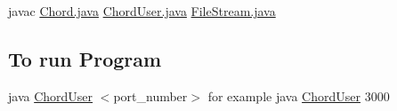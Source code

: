 {\ttfamily javac \hyperlink{_chord_8java}{Chord.\+java} \hyperlink{_chord_user_8java}{Chord\+User.\+java} \hyperlink{_file_stream_8java}{File\+Stream.\+java}} \subsection*{To run Program}

{\ttfamily java \hyperlink{class_chord_user}{Chord\+User} $<$port\+\_\+number$>$} for example java \hyperlink{class_chord_user}{Chord\+User} 3000 